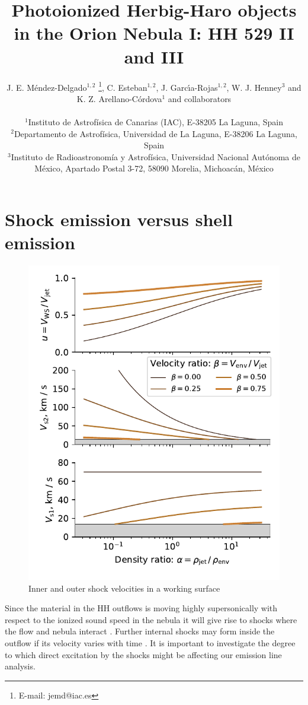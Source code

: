 \documentclass[useAMS, usenatbib]{mnras}
\title[HH 529 II and III in the Orion Nebula]{
  Photoionized Herbig-Haro objects in the Orion Nebula I: HH 529 II and III
}
\author[J. E. M\'endez-Delgado et al.]
{J. E. M\'endez-Delgado$^{1,2}$ \thanks{E-mail: jemd@iac.es},
  C. Esteban$^{1,2}$, J. Garc{\'{\i}}a-Rojas$^{1,2}$, W. J. Henney$^{3}$  
  \newauthor 
  and K. Z. Arellano-C\'ordova$^{1}$ and collaborators\\
\\
$^{1}$Instituto de Astrof\'isica de Canarias (IAC), E-38205 La Laguna, Spain\\
$^{2}$Departamento de Astrof\'isica, Universidad de La Laguna, E-38206 La Laguna, Spain\\
$^{3}$Instituto de Radioastronom\'ia y Astrof\'isica, Universidad Nacional Aut\'onoma de M\'exico, Apartado Postal 3-72, 58090 Morelia, Michoac\'an, M\'exico}
\begin{document}
\begin{table}
  \setcounter{table}{3}\caption{}\label{tab:pc}
  \setcounter{table}{12}\caption{}\label{tab:total_abundances_rls}
\end{table}

\section{Shock emission versus shell emission}
\label{sec:shoc-v-shell}

\begin{figure}
  \centering
  \includegraphics[width=\linewidth]{shock-velocities}
  \caption{Inner and outer shock velocities in a working surface}
  \label{fig:shock-velocities}
\end{figure}

\newcommand\Mach{\ensuremath{\mathcal{M}}}
\newcommand\shock{\ensuremath{_{\mathrm{sh}}}}
\newcommand\sound{\ensuremath{c_{\mathrm{s}}}}
Since the material in the HH outflows is moving highly supersonically
with respect to the ionized sound speed in the nebula
it will give rise to shocks where the flow and nebula interact
\citep{Hartigan:1987a}.
Further internal shocks may form inside the outflow
if its velocity varies with time \citep{Raga:1990a}.
It is important to investigate the degree to which direct excitation by the shocks
might be affecting our emission line analysis.
\end{document}
